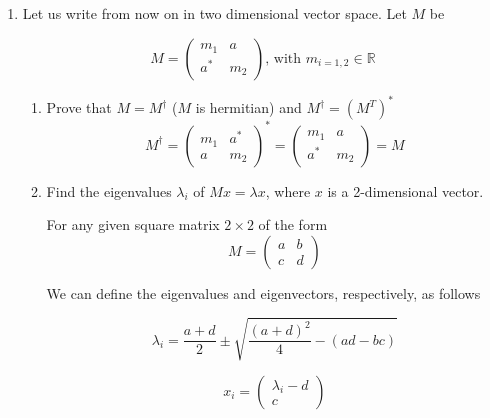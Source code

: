 \documentclass[11pt,letterpaper]{article}%
\begin{document}
\begin{enumerate}[label=\Large{\textbf{\arabic*.}}]
\item{
Let us write from now on in two dimensional vector space. Let $M$ be

\begin{equation}
\label{matrixM}
M = 
\begin{pmatrix}
m_1 & a\\
a^* & m_2
\end{pmatrix}
\text{, with } m_{i=1,2} \in \mathbb{R}
\end{equation}

\begin{enumerate}[label=\textit{\roman*.}]
\item{
Prove that $M = M^\dag$ ($M$ is hermitian) and $M^\dag = (M^T)^*$
\begin{equation}
\label{proofM}
M^\dag =
\begin{pmatrix}
m_1 & a^*\\
a & m_2
\end{pmatrix}^* =
\begin{pmatrix}
m_1 & a\\
a^* & m_2
\end{pmatrix} = M
\end{equation}
}

\item{
Find the eigenvalues $\lambda_i$ of $Mx=\lambda x$, where $x$ is a 2-dimensional vector.

\renewcommand\theequation{4.\alph{equation}}
\setcounter{equation}{0}
For any given square matrix $2\times2$ of the form
\begin{equation}
\label{matrixA}
M = 
\begin{pmatrix}
a & b\\
c & d
\end{pmatrix}
\end{equation}

We can define the eigenvalues and eigenvectors, respectively, as follows

\begin{equation}
\label{eigenval}
\lambda_i = \frac{a+d}{2} \pm \sqrt{\frac{(a+d)^2}{4} - \left( ad - bc \right)}
\end{equation}

\begin{equation}
\label{eigenvec}
x_i = 
\begin{pmatrix}
\lambda_i - d\\
c
\end{pmatrix}
\end{equation}

}
\end{enumerate}}
\end{enumerate}
\end{document}
